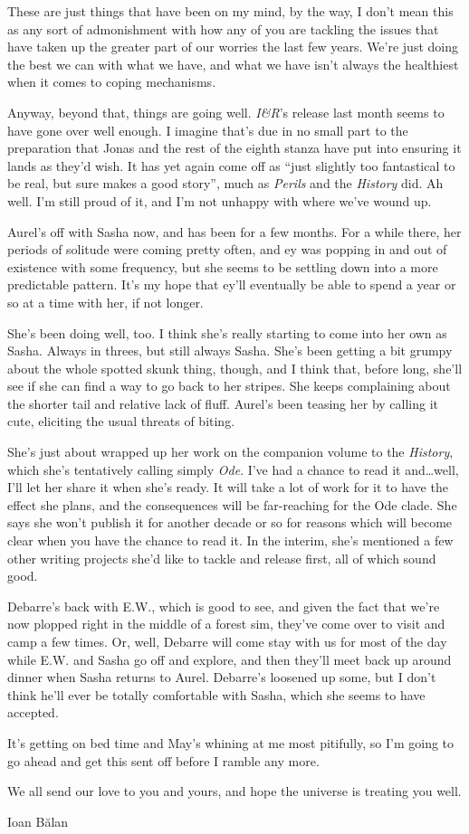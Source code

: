 These are just things that have been on my mind, by the way, I don't mean this as any sort of admonishment with how any of you are tackling the issues that have taken up the greater part of our worries the last few years. We're just doing the best we can with what we have, and what we have isn't always the healthiest when it comes to coping mechanisms.

Anyway, beyond that, things are going well. \emph{I\&R}'s release last month seems to have gone over well enough. I imagine that's due in no small part to the preparation that Jonas and the rest of the eighth stanza have put into ensuring it lands as they'd wish. It has yet again come off as ``just slightly too fantastical to be real, but sure makes a good story'', much as \emph{Perils} and the \emph{History} did. Ah well. I'm still proud of it, and I'm not unhappy with where we've wound up.

Aurel's off with Sasha now, and has been for a few months. For a while there, her periods of solitude were coming pretty often, and ey was popping in and out of existence with some frequency, but she seems to be settling down into a more predictable pattern. It's my hope that ey'll eventually be able to spend a year or so at a time with her, if not longer.

She's been doing well, too. I think she's really starting to come into her own as Sasha. Always in threes, but still always Sasha. She's been getting a bit grumpy about the whole spotted skunk thing, though, and I think that, before long, she'll see if she can find a way to go back to her stripes. She keeps complaining about the shorter tail and relative lack of fluff. Aurel's been teasing her by calling it cute, eliciting the usual threats of biting.

She's just about wrapped up her work on the companion volume to the \emph{History}, which she's tentatively calling simply \emph{Ode}. I've had a chance to read it and\ldots well, I'll let her share it when she's ready. It will take a lot of work for it to have the effect she plans, and the consequences will be far-reaching for the Ode clade. She says she won't publish it for another decade or so for reasons which will become clear when you have the chance to read it. In the interim, she's mentioned a few other writing projects she'd like to tackle and release first, all of which sound good.

Debarre's back with E.W., which is good to see, and given the fact that we're now plopped right in the middle of a forest sim, they've come over to visit and camp a few times. Or, well, Debarre will come stay with us for most of the day while E.W. and Sasha go off and explore, and then they'll meet back up around dinner when Sasha returns to Aurel. Debarre's loosened up some, but I don't think he'll ever be totally comfortable with Sasha, which she seems to have accepted.

It's getting on bed time and May's whining at me most pitifully, so I'm going to go ahead and get this sent off before I ramble any more.

We all send our love to you and yours, and hope the universe is treating you well.

Ioan Bălan
